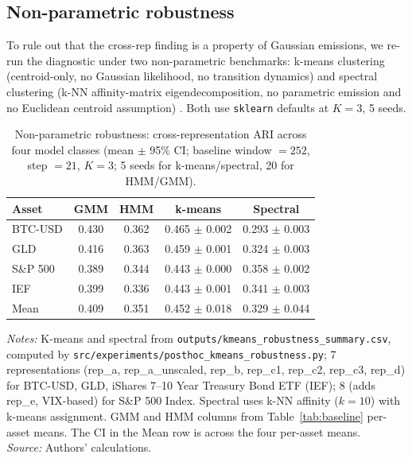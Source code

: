 \documentclass[preprint,12pt,authoryear]{elsarticle}
\newcommand{\SPX}{S\&P 500 Index}
\newcommand{\IEF}{iShares 7--10 Year Treasury Bond ETF (IEF)}
\begin{document}
\subsection{Non-parametric robustness}
\label{sec:nonparam}

To rule out that the cross-rep finding is a property of Gaussian emissions, we re-run the diagnostic under two non-parametric benchmarks: k-means clustering (centroid-only, no Gaussian likelihood, no transition dynamics) and spectral clustering (k-NN affinity-matrix eigendecomposition, no parametric emission and no Euclidean centroid assumption) \citep{vonLuxburg2010}. Both use \texttt{sklearn} defaults at $K=3$, 5 seeds.

\begin{table}[!htbp]
\centering
\small
\setlength{\tabcolsep}{6pt}
\caption{Non-parametric robustness: cross-representation ARI across four model classes (mean $\pm$ 95\% CI; baseline window $=252$, step $=21$, $K=3$; 5 seeds for k-means/spectral, 20 for HMM/GMM).}
\label{tab:kmeans_robustness}
\begin{tabular}{lcccc}
\toprule
Asset & GMM & HMM & k-means & Spectral \\
\midrule
BTC-USD  & 0.430 & 0.362 & 0.465 $\pm$ 0.002 & 0.293 $\pm$ 0.003 \\
GLD      & 0.416 & 0.363 & 0.459 $\pm$ 0.001 & 0.324 $\pm$ 0.003 \\
S\&P 500 & 0.389 & 0.344 & 0.443 $\pm$ 0.000 & 0.358 $\pm$ 0.002 \\
IEF      & 0.399 & 0.336 & 0.443 $\pm$ 0.001 & 0.341 $\pm$ 0.003 \\
\midrule
Mean     & 0.409 & 0.351 & 0.452 $\pm$ 0.018 & 0.329 $\pm$ 0.044 \\
\bottomrule
\end{tabular}
\par\medskip
\footnotesize
\parbox{\linewidth}{\textit{Notes:} K-means and spectral from \texttt{outputs/kmeans\_robustness\_summary.csv}, computed by \texttt{src/experiments/posthoc\_kmeans\_robustness.py}; 7 representations (rep\_a, rep\_a\_unscaled, rep\_b, rep\_c1, rep\_c2, rep\_c3, rep\_d) for BTC-USD, GLD, \IEF{}; 8 (adds rep\_e, VIX-based) for \SPX{}. Spectral uses k-NN affinity ($k=10$) with k-means assignment. GMM and HMM columns from Table~\ref{tab:baseline} per-asset means. The CI in the Mean row is across the four per-asset means.\\
\textit{Source:} Authors' calculations.}
\end{table}
\end{document}
